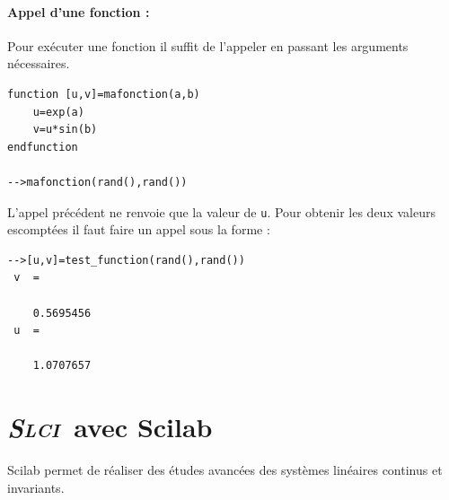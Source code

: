 \paragraph{Appel d'une fonction :}
Pour exécuter une fonction il suffit de l'appeler en passant les arguments 
nécessaires.
\begin{code}
\begin{verbatim}
function [u,v]=mafonction(a,b)
    u=exp(a)
    v=u*sin(b)
endfunction

-->mafonction(rand(),rand())
\end{verbatim}
\end{code}
L'appel précédent ne renvoie que la valeur de \verb?u?. 
Pour obtenir les deux valeurs escomptées il faut faire un appel sous la forme  :
\begin{code}
\begin{verbatim}
-->[u,v]=test_function(rand(),rand())
 v  =
 
    0.5695456  
 u  =
 
    1.0707657  
\end{verbatim}
\end{code}



\newpage
\section{\emph{{\scshape Slci}}~avec Scilab}

Scilab permet de réaliser des études avancées des systèmes linéaires continus 
et invariants.


